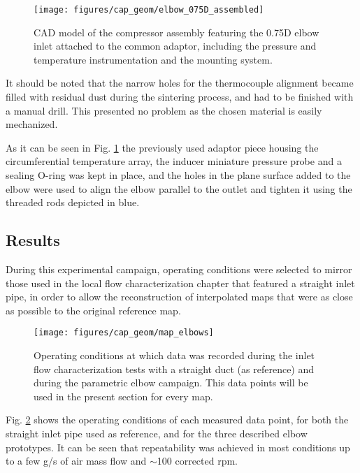 \begin{figure}[b!]
\centering
\texttt{[image: figures/cap\_geom/elbow\_075D\_assembled]}
\caption[CAD model of the compressor assembly]{CAD model of the compressor assembly featuring the 0.75D elbow inlet attached to the common adaptor, including the pressure and temperature instrumentation and the mounting system.}
\label{fig:elbow_075D_assembled}
\end{figure}

It should be noted that the narrow holes for the thermocouple alignment became filled with residual dust during the sintering process, and had to be finished with a manual drill. This presented no problem as the chosen material is easily mechanized.

As it can be seen in Fig. \ref{fig:elbow_075D_assembled} the previously used adaptor piece housing the circumferential temperature array, the inducer miniature pressure probe and a sealing O-ring was kept in place, and the holes in the plane surface added to the elbow were used to align the elbow parallel to the outlet and tighten it using the threaded rods depicted in blue.

\subsection{Results}

During this experimental campaign, operating conditions were selected to mirror those used in the local flow characterization chapter that featured a straight inlet pipe, in order to allow the reconstruction of interpolated maps that were as close as possible to the original reference map.

\begin{figure}[bht!]
\centering
\texttt{[image: figures/cap\_geom/map\_elbows]}
\caption[Operating conditions measured for each geometry]{Operating conditions at which data was recorded during the inlet flow characterization tests with a straight duct (as reference) and during the parametric elbow campaign. This data points will be used in the present section for every map.}
\label{fig:map_elbows}
\end{figure}

Fig. \ref{fig:map_elbows} shows the operating conditions of each measured data point, for both the straight inlet pipe used as reference, and for the three described elbow prototypes. It can be seen that repeatability was achieved in most conditions up to a few g/s of air mass flow and $\sim$100 corrected rpm. 

